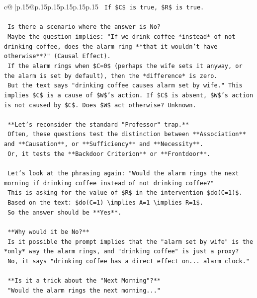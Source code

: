 \documentclass{article}
\begin{document}
{\begin{supertabular}{c@{$\;$}|p{.15\linewidth}@{}p{.15\linewidth}p{.15\linewidth}p{.15\linewidth}p{.15\linewidth}p{.15\linewidth}}
{{{\texttt{        If \$C\$ is true, \$R\$ is true.} \\
\\ 
\texttt{        Is there a scenario where the answer is No?} \\
\texttt{        Maybe the question implies: "If we drink coffee *instead* of not drinking coffee, does the alarm ring **that it wouldn't have otherwise**?" (Causal Effect).} \\
\texttt{        If the alarm rings when \$C=0\$ (perhaps the wife sets it anyway, or the alarm is set by default), then the *difference* is zero.} \\
\texttt{        But the text says "drinking coffee causes alarm set by wife." This implies \$C\$ is a cause of \$W\$'s action. If \$C\$ is absent, \$W\$'s action is not caused by \$C\$. Does \$W\$ act otherwise? Unknown.} \\
\\ 
\texttt{        **Let's reconsider the standard "Professor" trap.**} \\
\texttt{        Often, these questions test the distinction between **Association** and **Causation**, or **Sufficiency** and **Necessity**.} \\
\texttt{        Or, it tests the **Backdoor Criterion** or **Frontdoor**.} \\
\\ 
\texttt{        Let's look at the phrasing again: "Would the alarm rings the next morning if drinking coffee instead of not drinking coffee?"} \\
\texttt{        This is asking for the value of \$R\$ in the intervention \$do(C=1)\$.} \\
\texttt{        Based on the text: \$do(C=1) \textbackslash{}implies A=1 \textbackslash{}implies R=1\$.} \\
\texttt{        So the answer should be **Yes**.} \\
\\ 
\texttt{        **Why would it be No?**} \\
\texttt{        Is it possible the prompt implies that the "alarm set by wife" is the *only* way the alarm rings, and "drinking coffee" is just a proxy?} \\
\texttt{        No, it says "drinking coffee has a direct effect on... alarm clock."} \\
\\ 
\texttt{        **Is it a trick about the "Next Morning"?**} \\
\texttt{        "Would the alarm rings the next morning..."} \\
}}}
\end{supertabular}}
\end{document}
